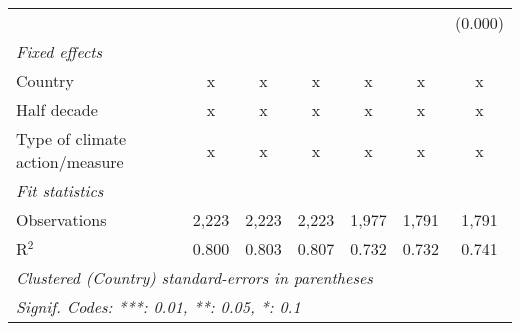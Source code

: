 \begin{tabular}{lcccccc}
                                                      &         &               &                &                &                & (0.000)\\   
   \emph{Fixed effects}\\
   Country                                            & x       & x             & x              & x              & x              & x\\  
   Half decade                                        & x       & x             & x              & x              & x              & x\\  
   Type of climate action/measure                     & x       & x             & x              & x              & x              & x\\  
   \midrule \emph{Fit statistics}\\
   Observations                                       & 2,223   & 2,223         & 2,223          & 1,977          & 1,791          & 1,791\\  
   R$^2$                                              & 0.800   & 0.803         & 0.807          & 0.732          & 0.732          & 0.741\\  
   \midrule
   \multicolumn{7}{l}{\emph{Clustered (Country) standard-errors in parentheses}}\\
   \multicolumn{7}{l}{\emph{Signif. Codes: ***: 0.01, **: 0.05, *: 0.1}}\\
\end{tabular}
\par\endgroup



